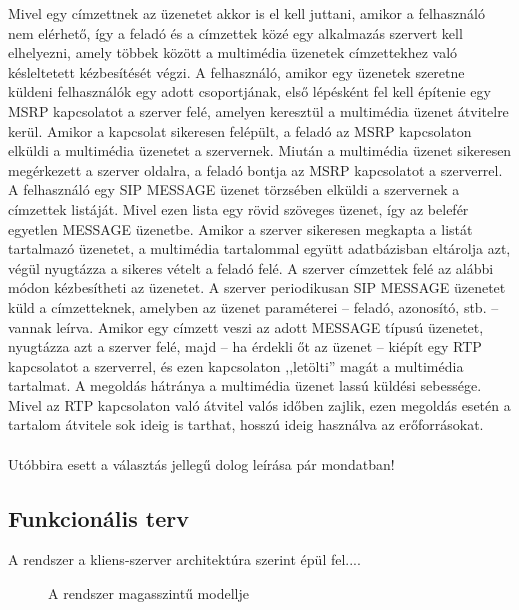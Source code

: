 Mivel egy címzettnek az üzenetet akkor is el kell juttani, amikor a felhasználó nem elérhető, így a feladó és a címzettek közé egy alkalmazás szervert kell elhelyezni, amely többek között a multimédia üzenetek címzettekhez való késleltetett kézbesítését végzi. A felhasználó, amikor egy üzenetek szeretne küldeni felhasználók egy adott csoportjának, első lépésként fel kell építenie egy MSRP kapcsolatot a szerver felé, amelyen keresztül a multimédia üzenet átvitelre kerül. Amikor a kapcsolat sikeresen felépült, a feladó az MSRP kapcsolaton elküldi a multimédia üzenetet a szervernek. Miután a multimédia üzenet sikeresen megérkezett a szerver oldalra, a feladó bontja az MSRP kapcsolatot a szerverrel. A felhasználó egy SIP MESSAGE üzenet törzsében elküldi a szervernek a címzettek listáját. Mivel ezen lista egy rövid szöveges üzenet, így az belefér egyetlen MESSAGE üzenetbe. Amikor a szerver sikeresen megkapta a listát tartalmazó üzenetet, a multimédia tartalommal együtt adatbázisban eltárolja azt, végül nyugtázza a sikeres vételt a feladó felé. A szerver címzettek felé az alábbi módon kézbesítheti az üzenetet. A szerver periodikusan SIP MESSAGE üzenetet küld a címzetteknek, amelyben az üzenet paraméterei -- feladó, azonosító, stb. -- vannak leírva. Amikor egy címzett veszi az adott MESSAGE típusú üzenetet, nyugtázza azt a szerver felé, majd -- ha érdekli őt az üzenet -- kiépít egy RTP kapcsolatot a szerverrel, és ezen kapcsolaton ,,letölti'' magát a multimédia tartalmat. A megoldás hátránya a multimédia üzenet lassú küldési sebessége. Mivel az RTP kapcsolaton való átvitel valós időben zajlik, ezen megoldás esetén a tartalom átvitele sok ideig is tarthat, hosszú ideig használva az erőforrásokat.
\\
\\
{\color{red}Utóbbira esett a választás jellegű dolog leírása pár mondatban!}

\subsection{Funkcionális terv}

A rendszer a kliens-szerver architektúra szerint épül fel....

\begin{figure}[htbp]
\center
{}
\caption{A rendszer magasszintű modellje}
\label{fig:model}
\end{figure}


